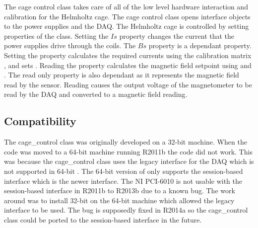 The cage control class takes care of all of the low level hardware interaction and calibration for the Helmholtz cage. The cage control class opens interface objects to the power supplies and the \ac{DAQ}. The Helmholtz cage is controlled by setting properties of the class. Setting the \lstMat$Is$ property changes the current that the power supplies drive through the coils. The \lstMat$Bs$ property is a dependant property. Setting the  property calculates the required currents using the calibration matrix , and sets . Reading the  property calculates the magnetic field setpoint using  and . The read only  property is also dependant as it represents the magnetic field read by the sensor. Reading  causes the output voltage of the magnetometer to be read by the \ac{DAQ} and converted to a magnetic field reading.

\subsection{Compatibility}

The cage\_control class was originally developed on a 32-bit machine. When the code was moved to a 64-bit machine running \matlab R2011b the code did not work. This was because the cage\_control class uses the legacy interface for the \ac{DAQ} which is not supported in 64-bit \matlab. The 64-bit version of \matlab only supports the session-based interface which is the newer interface. The NI PCI-6010 is not usable with the session-based interface in \matlab R2011b to R2013b due to a known bug. The work around was to install 32-bit \matlab on the 64-bit machine which allowed the legacy interface to be used. The bug is supposedly fixed in \matlab R2014a so the cage\_control class could be ported to the session-based interface in the future.

